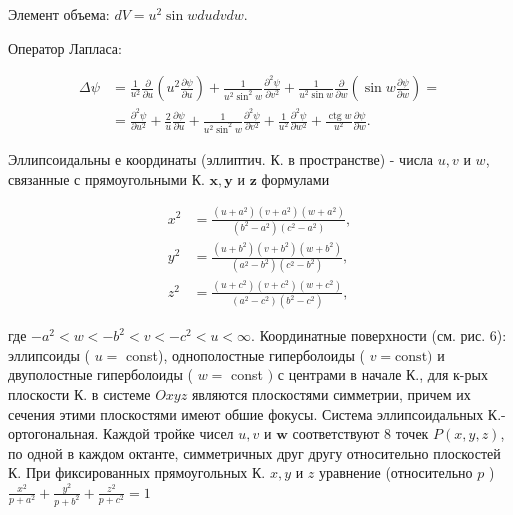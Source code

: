 \documentclass[10pt]{article}
\begin{document}
Элемент объема: $d V=u^{2} \sin w d u d v d w$.



Оператор Лапласа:



\[

\begin{aligned}

\Delta \psi & =\frac{1}{u^{2}} \frac{\partial}{\partial u}\left(u^{2} \frac{\partial \psi}{\partial u}\right)+\frac{1}{u^{2} \sin ^{2} w} \frac{\partial^{2} \psi}{\partial v^{2}}+\frac{1}{u^{2} \sin w} \frac{\partial}{\partial w}\left(\sin w \frac{\partial \psi}{\partial w}\right)= \\

& =\frac{\partial^{2} \psi}{\partial u^{2}}+\frac{2}{u} \frac{\partial \psi}{\partial u}+\frac{1}{u^{2} \sin ^{2} w} \frac{\partial^{2} \psi}{\partial v^{2}}+\frac{1}{u^{2}} \frac{\partial^{2} \psi}{\partial w^{2}}+\frac{\operatorname{ctg} w}{u^{2}} \frac{\partial \psi}{\partial w} .

\end{aligned}

\]



Эллипсоидальны е координаты (эллиптич. К. в пространстве) - числа $u, v$ и $w$, связанные с прямоугольными К. $\boldsymbol{x}, \boldsymbol{y}$ и $\boldsymbol{z}$ формулами



\[

\begin{aligned}

x^{2} & =\frac{\left(u+a^{2}\right)\left(v+a^{2}\right)\left(w+a^{2}\right)}{\left(b^{2}-a^{2}\right)\left(c^{2}-a^{2}\right)}, \\

y^{2} & =\frac{\left(u+b^{2}\right)\left(v+b^{2}\right)\left(w+b^{2}\right)}{\left(a^{2}-b^{2}\right)\left(c^{2}-b^{2}\right)}, \\

z^{2} & =\frac{\left(u+c^{2}\right)\left(v+c^{2}\right)\left(w+c^{2}\right)}{\left(a^{2}-c^{2}\right)\left(b^{2}-c^{2}\right)},

\end{aligned}

\]



где $-a^{2}<w<-b^{2}<v<-c^{2}<u<\infty$. Координатные поверхности (см. рис. 6): эллипсоиды ( $u=$ const), однополостные гиперболоиды ( $v=\mathrm{const})$ и двуполостные гиперболоиды ( $w=$ const $)$ с центрами в начале К., для к-рых плоскости К. в системе $O x y z$ являются плоскостями симметрии, причем их сечения этими плоскостями имеют обшие фокусы. Система эллипсоидальных К.- ортогональная. Каждой тройке чисел $u, v$ и $\boldsymbol{w}$ соответствуют 8 точек $P(x, y, z)$, по одной в каждом октанте, симметричных друг другу относительно плоскостей К. При фиксированных прямоугольных К. $x, y$ и $z$ уравнение (относительно $p$ ) $\frac{x^{2}}{p+a^{2}}+\frac{y^{2}}{p+b^{2}}+\frac{z^{2}}{p+c^{2}}=1$
\end{document}
